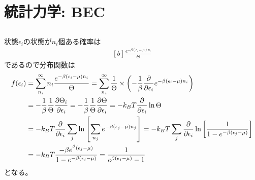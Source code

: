\documentclass[../../master.tex]{subfiles}
\begin{document}



\clearpage
\section{統計力学: BEC}
\subsection{}
状態\(\epsilon_i\)の状態が\(n_i\)個ある確率は
\begin{equation}\begin{aligned}[b]
    \frac{e^{-\beta(\epsilon_i-\mu)n_i}}{\Theta}
\end{aligned}\end{equation}
であるので分布関数は
\begin{equation}\begin{aligned}[b]
    f(\epsilon_i)
    &=\sum_{n_i}^{\infty}n_i \frac{e^{-\beta(\epsilon_i-\mu)n_i}}{\Theta}
    =\sum_{n_i}^{\infty}\frac{1}{\Theta} \times\qty(-\frac{1}{\beta}\pdv{\epsilon_i} e^{-\beta(\epsilon_i-\mu)n_i})\\
    &=-\frac{1}{\beta}\frac{1}{\Theta} \pdv{\Theta_i}{\epsilon_i}
    =-\frac{1}{\beta}\frac{1}{\Theta} \pdv{\Theta}{\epsilon_i}
    =-k_BT\pdv{\epsilon_i}\ln\Theta\\
    &=-k_BT\pdv{\epsilon_i} \sum_j \ln\qty[\sum_{n_j}e^{-\beta(\epsilon_j-\mu)n_j}]
    =-k_BT\sum_{j}\pdv{\epsilon_i}\ln\qty[\frac{1}{1-e^{-\beta(\epsilon_j-\mu)}}]\\
    &= -k_BT\frac{-\beta e^{^\beta(\epsilon_j-\mu)}}{1-e^{-\beta(\epsilon_j-\mu)}}
    = \frac{1}{e^{\beta(\epsilon_j-\mu)}-1}
\end{aligned}\end{equation}
となる。
\end{document}
